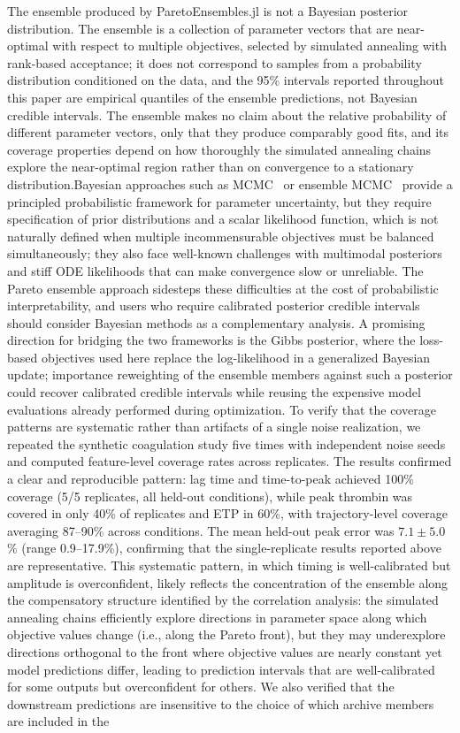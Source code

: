 \documentclass[preprint,review,12pt]{elsarticle}
\begin{document}
The ensemble produced by ParetoEnsembles.jl is not a Bayesian posterior distribution. The ensemble is a collection of parameter vectors that are near-optimal with respect to multiple objectives, selected by simulated annealing with rank-based acceptance; it does not correspond to samples from a probability distribution conditioned on the data, and the 95\% intervals reported throughout this paper are empirical quantiles of the ensemble predictions, not Bayesian credible intervals. The ensemble makes no claim about the relative probability of different parameter vectors, only that they produce comparably good fits, and its coverage properties depend on how thoroughly the simulated annealing chains explore the near-optimal region rather than on convergence to a stationary distribution.Bayesian approaches such as MCMC~\cite{Carpenter2017,Ge2018} or ensemble MCMC~\cite{ForemanMackey2013} provide a principled probabilistic framework for parameter uncertainty, but they require specification of prior distributions and a scalar likelihood function, which is not naturally defined when multiple incommensurable objectives must be balanced simultaneously; they also face well-known challenges with multimodal posteriors and stiff ODE likelihoods that can make convergence slow or unreliable. The Pareto ensemble approach sidesteps these difficulties at the cost of probabilistic interpretability, and users who require calibrated posterior credible intervals should consider Bayesian methods as a complementary analysis. A promising direction for bridging the two frameworks is the Gibbs posterior, where the loss-based objectives used here replace the log-likelihood in a generalized Bayesian update; importance reweighting of the ensemble members against such a posterior could recover calibrated credible intervals while reusing the expensive model evaluations already performed during optimization. To verify that the coverage patterns are systematic rather than artifacts of a single noise realization, we repeated the synthetic coagulation study five times with independent noise seeds and computed feature-level coverage rates across replicates. The results confirmed a clear and reproducible pattern: lag time and time-to-peak achieved 100\% coverage (5/5 replicates, all held-out conditions), while peak thrombin was covered in only 40\% of replicates and ETP in 60\%, with trajectory-level coverage averaging 87--90\% across conditions. The mean held-out peak error was $7.1 \pm 5.0$\% (range 0.9--17.9\%), confirming that the single-replicate results reported above are representative. This systematic pattern, in which timing is well-calibrated but amplitude is overconfident, likely reflects the concentration of the ensemble along the compensatory structure identified by the correlation analysis: the simulated annealing chains efficiently explore directions in parameter space along which objective values change (i.e., along the Pareto front), but they may underexplore directions orthogonal to the front where objective values are nearly constant yet model predictions differ, leading to prediction intervals that are well-calibrated for some outputs but overconfident for others. We also verified that the downstream predictions are insensitive to the choice of which archive members are included in the 
\end{document}
